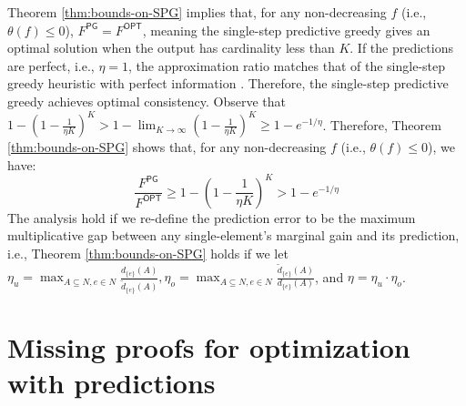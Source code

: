 Theorem \ref{thm:bounds-on-SPG} implies that, for any non-decreasing $f$ (i.e., $\theta(f) \leq 0$), $F^{\textsf{PG}} = F^{\textsf{OPT}}$, meaning the single-step predictive greedy gives an optimal solution when the output has cardinality less than $K$. 
If the predictions are perfect, i.e., $\eta = 1$, the approximation ratio matches that of the single-step greedy heuristic with perfect information \cite{greedySubmodularFunctions}. Therefore, the single-step predictive greedy achieves optimal consistency. Observe that $1 - (1 - \frac{1}{\eta K})^K > 1 - \lim_{K \rightarrow \infty}{(1 - \frac{1}{\eta K})^K} \geq 1 - e^{-1/\eta}$. Therefore, Theorem \ref{thm:bounds-on-SPG} shows that, for any non-decreasing $f$ (i.e., $\theta(f) \leq 0$), we have:
\[ \frac{F^{\textsf{PG}}}{F^{\textsf{OPT}}} \geq 1 - (1 - \frac{1}{\eta K})^K > 1 - e^{-1/\eta} \]
The analysis hold if we re-define the prediction error to be the maximum multiplicative gap between any single-element's marginal gain and its prediction, i.e., Theorem \ref{thm:bounds-on-SPG} holds if we let $\eta_u = \max_{A \subseteq N, e \in N}{\frac{d_{\{e\}}(A)}{\tilde{d}_{\{e\}}(A)}}, \eta_o = \max_{A \subseteq N, e \in N}{\frac{\tilde{d}_{\{ e \}}(A)}{d_{\{e\}}(A)}}$, and $\eta = \eta_u \cdot \eta_o$.


\section{Missing proofs for optimization with predictions} \label{appendix:proof-section-3}

